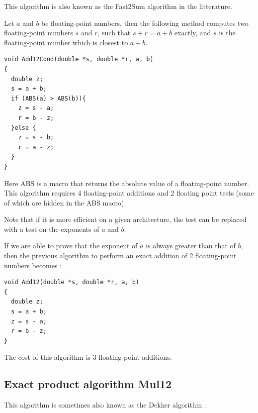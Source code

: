 This algorithm is also known as the Fast2Sum algorithm in the
litterature.
\begin{theorem}
  Let $a$ and $b$ be floating-point numbers, then the following method
  computes two floating-point numbers $s$ and $r$, such that $s+r =
  a+b$ exactly, and $s$ is the floating-point number which is closest
  to $a+b$.

\begin{lstlisting}[label={lst:Add12Cond},caption={Add12Cond},firstnumber=1]
void Add12Cond(double *s, double *r, a, b) 
{
  double z;
  s = a + b;            
  if (ABS(a) > ABS(b)){  
    z = s - a;           
    r = b - z;           
  }else {                 
    z = s - b;           
    r = a - z;           
  } 
}                         
\end{lstlisting}
Here ABS is a macro that returns the absolute value of a
floating-point number. This algorithm requires $4$ floating-point additions and $2$ floating
point tests (some of which are hidden in the ABS macro). 

Note that if it is more efficient on a given architecture, the test can be replaced
with a test on the exponents of $a$ and $b$.

\end{theorem}


If we are able to prove that  the exponent of $a$ is always greater than that
of $b$, then the previous algorithm to perform an exact addition of 2
floating-point numbers becomes :
\begin{lstlisting}[label={lst:Add12},caption={Add12},firstnumber=1]
void Add12(double *s, double *r, a, b) 
{
  double z;
  s = a + b;            
  z = s - a;  
  r = b - z; 
}            
\end{lstlisting}
The cost of this algorithm is $3$ floating-point additions.






\subsection{Exact product algorithm {Mul12}}

This algorithm is sometimes  also known as the Dekker algorithm \cite{Dek71,Knu73}.

